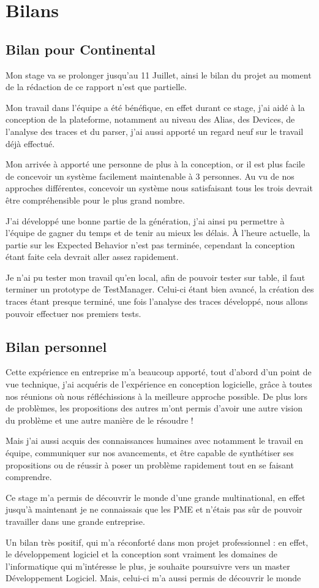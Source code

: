 \chapter{Bilans}
	\section{Bilan pour Continental}
	Mon stage va se prolonger jusqu'au 11 Juillet, ainsi le bilan du projet au moment de la rédaction de ce rapport n'est que partielle. 

	Mon travail dans l'équipe a été bénéfique, en effet durant ce stage, j'ai aidé à la conception de la plateforme, notamment au niveau des Alias, des Devices, de l'analyse des traces et du parser, 
	j'ai aussi apporté un regard neuf sur le travail déjà effectué.

	Mon arrivée à apporté une personne de plus à la conception, or il est plus facile de concevoir un système facilement maintenable à 3 personnes. Au vu de nos
	approches différentes, concevoir un système nous satisfaisant tous les trois devrait être compréhensible pour le plus grand nombre.
	
	J'ai développé une bonne partie de la génération, j'ai ainsi pu permettre à l'équipe de gagner du temps et de
	tenir au mieux les délais. À l'heure actuelle, la partie sur les Expected Behavior n'est pas terminée, cependant la conception étant faite cela devrait aller
	assez rapidement.
	
	Je n'ai pu tester mon travail qu'en local, afin de pouvoir tester sur table, il faut terminer un prototype de TestManager. Celui-ci étant bien
	avancé, la création des traces étant presque terminé, une fois l'analyse des traces développé, nous allons pouvoir effectuer nos premiers tests.

	\section{Bilan personnel}
	Cette expérience en entreprise m'a beaucoup apporté, tout d'abord d'un point de vue technique, j'ai acquéris de l'expérience en conception logicielle, grâce
	à toutes nos réunions où nous réfléchissions à la meilleure approche possible. De plus lors de problèmes, les propositions des autres m'ont permis d'avoir
	une autre vision du problème et une autre manière de le résoudre !

	Mais j'ai aussi acquis des connaissances humaines avec notamment le travail en équipe, communiquer sur nos avancements, et être capable de synthétiser ses
	propositions ou de réussir à poser un problème rapidement tout en se faisant comprendre.

	Ce stage m'a permis de découvrir le monde d'une grande multinational, en effet jusqu'à maintenant je ne connaissais que les PME et n'étais pas sûr de pouvoir
	travailler dans une grande entreprise.

	Un bilan très positif, qui m'a réconforté dans mon projet professionnel : en effet, le développement logiciel et la conception sont vraiment les domaines de
	l'informatique qui m'intéresse le plus, je souhaite poursuivre vers un master Développement Logiciel. Mais, celui-ci m'a aussi permis de découvrir le monde
